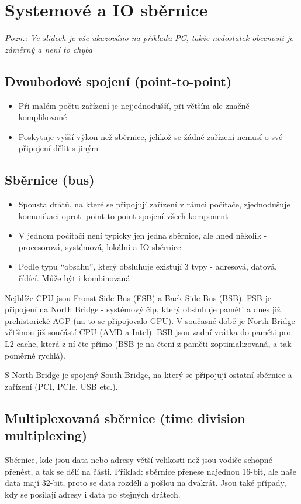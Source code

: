 \documentclass[10pt,a4paper,openright]{article}
\begin{document}
\section{Systemové a IO sběrnice}
\textit{Pozn.: Ve slidech je vše ukazováno na příkladu PC, takže nedostatek obecnosti je záměrný a není to chyba}

\subsection{Dvoubodové spojení (point-to-point)}
\begin{itemize}
\item Při malém počtu zařízení je nejjednodušší, při větším ale značně komplikované
\item Poskytuje vyšší výkon než sběrnice, jelikož se žádné zařízení nemusí o své připojení dělit s jiným
\end{itemize}

\subsection{Sběrnice (bus)}
\begin{itemize}
\item Spousta drátů, na které se připojují zařízení v rámci počítače, zjednodušuje komunikaci oproti point-to-point spojení všech komponent
\item V jednom počítači není typicky jen jedna sběrnice, ale hned několik - procesorová, systémová, lokální a IO sběrnice
\item Podle typu ``obsahu'', který obsluhuje existují 3 typy - adresová, datová, řídící. Může být i kombinovaná
\end{itemize}
Nejblíže CPU jsou Fronst-Side-Bus (FSB) a Back Side Bus (BSB). FSB je připojení na North Bridge - systémový čip, který obsluhuje paměti a dnes již prehistorické AGP (na to se připojovalo GPU). V současné době je North Bridge většinou již součástí CPU (AMD a Intel). BSB jsou zadní vrátka do paměti pro L2 cache, která z ní čte přímo (BSB je na čtení z paměti zoptimalizovaná, a tak poměrně rychlá).

S North Bridge je spojený South Bridge, na který se připojují ostatní sběrnice a zařízení (PCI, PCIe, USB etc.).

\subsection{Multiplexovaná sběrnice (time division multiplexing)}
Sběrnice, kde jsou data nebo adresy větší velikosti než jsou vodiče schopné přenést, a tak se dělí na části. Příklad: sběrnice přenese najednou 16-bit, ale naše data mají 32-bit, proto se data rozdělí a pošlou na dvakrát. Jsou také případy, kdy se posílají adresy i data po stejných drátech.
\end{document}
